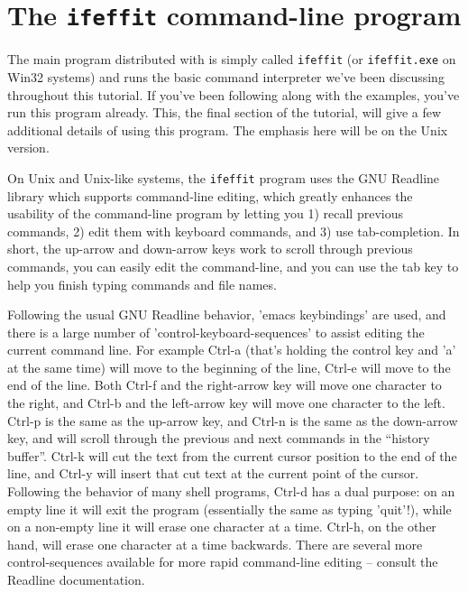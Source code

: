 \documentclass[11pt]{article}
\begin{document}
\clearpage
\section{The {\tt{ifeffit}} command-line program}\label{s:cmdline}

The main program distributed with {\ifeffit} is simply called
{\tt{ifeffit}} (or {\tt{ifeffit.exe}} on Win32 systems) and runs the basic
command interpreter we've been discussing throughout this tutorial.  If
you've been following along with the examples, you've run this program
already.  This, the final section of the tutorial, will give a few
additional details of using this program.  The emphasis here will be on the
Unix version.

On Unix and Unix-like systems, the {\tt{ifeffit}} program uses the GNU
Readline library which supports command-line editing, which greatly
enhances the usability of the command-line program by letting you 1) recall
previous commands, 2) edit them with keyboard commands, and 3) use
tab-completion.  In short, the up-arrow and down-arrow keys work to scroll
through previous commands, you can easily edit the command-line, and you
can use the tab key to help you finish typing commands and file names.

Following the usual GNU Readline behavior, 'emacs keybindings' are used,
and there is a large number of 'control-keyboard-sequences' to assist
editing the current command line.  For example Ctrl-a (that's holding the
control key and 'a' at the same time) will move to the beginning of the
line, Ctrl-e will move to the end of the line.  Both Ctrl-f and the
right-arrow key will move one character to the right, and Ctrl-b and the
left-arrow key will move one character to the left.  Ctrl-p is the same as
the up-arrow key, and Ctrl-n is the same as the down-arrow key, and will
scroll through the previous and next commands in the ``history buffer''.
Ctrl-k will cut the text from the current cursor position to the end of the
line, and Ctrl-y will insert that cut text at the current point of the
cursor.  Following the behavior of many shell programs, Ctrl-d has a dual
purpose: on an empty line it will exit the program (essentially the same as
typing 'quit'!), while on a non-empty line it will erase one character at a
time.  Ctrl-h, on the other hand, will erase one character at a time
backwards.  There are several more control-sequences available for more
rapid command-line editing -- consult the Readline documentation.
\end{document}
